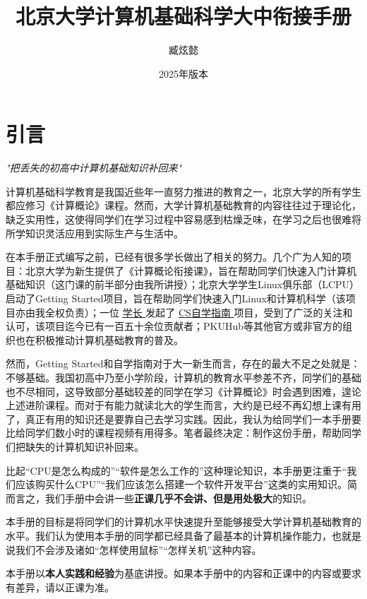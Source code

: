 \documentclass[12pt, openany]{book}
\title{\Huge\textbf{北京大学计算机基础科学大中衔接手册}}
\author[a]{臧炫懿}
\affil[a]{北京大学信息科学技术学院、北京大学学生Linux俱乐部}
\date{2025年版本}
\let\oldhref\href
\renewcommand{\href}[2]{%
  \oldhref{#1}{%
    \color{blue}\underline{#2}%
    \raisebox{0.2ex}{\tiny$\nearrow$}%
  }%
}
\begin{document}
\maketitle

\frontmatter

\chapter{引言}

\begin{center}
  \emph{"把丢失的初高中计算机基础知识补回来"}
\end{center}

计算机基础科学教育是我国近些年一直努力推进的教育之一，北京大学的所有学生都应修习《计算概论》课程。然而，大学计算机基础教育的内容往往过于理论化，缺乏实用性，这使得同学们在学习过程中容易感到枯燥乏味，在学习之后也很难将所学知识灵活应用到实际生产与生活中。

在本手册正式编写之前，已经有很多学长做出了相关的努力。几个广为人知的项目：北京大学为新生提供了《计算概论衔接课》，旨在帮助同学们快速入门计算机基础知识（这门课的前半部分由我所讲授）；北京大学学生Linux俱乐部（LCPU）启动了Getting Started项目，旨在帮助同学们快速入门Linux和计算机科学（该项目亦由我全权负责）；一位\faGithub\href{https://github.com/PKUFlyingPig}{学长}发起了\href{https://csdiy.wiki/}{CS自学指南}项目，受到了广泛的关注和认可，该项目迄今已有一百五十余位贡献者；PKUHub等其他官方或非官方的组织也在积极推动计算机基础教育的普及。

然而，Getting Started和自学指南对于大一新生而言，存在的最大不足之处就是：不够基础。我国初高中乃至小学阶段，计算机的教育水平参差不齐，同学们的基础也不尽相同，这导致部分基础较差的同学在学习《计算概论》时会遇到困难，遑论上述进阶课程。而对于有能力就读北大的学生而言，大约是已经不再幻想上课有用了，真正有用的知识还是要靠自己去学习实践。因此，我认为给同学们一本手册要比给同学们数小时的课程视频有用得多。笔者最终决定：制作这份手册，帮助同学们把缺失的计算机知识补回来。

比起“CPU是怎么构成的”“软件是怎么工作的”这种理论知识，本手册更注重于“我们应该购买什么CPU”“我们应该怎么搭建一个软件开发平台”这类的实用知识。简而言之，我们手册中会讲一些\textbf{正课几乎不会讲、但是用处极大}的知识。

本手册的目标是将同学们的计算机水平快速提升至能够接受大学计算机基础教育的水平。我们认为使用本手册的同学都已经具备了最基本的计算机操作能力，也就是说我们不会涉及诸如“怎样使用鼠标”“怎样关机”这种内容。

本手册以\textbf{本人实践和经验}为基底讲授。如果本手册中的内容和正课中的内容或要求有差异，请以正课为准。
\end{document}
